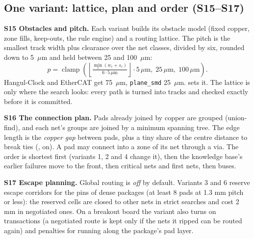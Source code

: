 \documentclass[10pt,a4paper]{article}
\newcommand{\opt}[1]{\texttt{\detokenize{#1}}}
\newcommand{\step}[1]{\textsf{\textbf{#1}}}
\begin{document}
\subsection{One variant: lattice, plan and order (S15--S17)}

\step{S15 Obstacles and pitch.} Each variant builds its obstacle model (fixed copper, zone fills, keep-outs, the rule engine) and a
routing lattice. The pitch is the smallest track width plus clearance over the net classes, divided by six, rounded down to 5~$\mu$m and
held between 25 and 100~$\mu$m:
\[ p = \operatorname{clamp}\!\left(\left\lfloor \tfrac{\min_c (w_c + s_c)}{6 \cdot 5\,\mu\text{m}} \right\rfloor \cdot 5\,\mu\text{m},\; 25\,\mu\text{m},\; 100\,\mu\text{m}\right). \]
Hangul-Clock and EtherCAT get 75~$\mu$m, \texttt{plane\_smd} 25~$\mu$m. \opt{--pitch-um} sets it. The lattice is only where the
search looks: every path is turned into tracks and checked exactly before it is committed.

\step{S16 The connection plan.} Pads already joined by copper are grouped (union-find), and each net's groups are joined by a minimum
spanning tree. The edge length is the \emph{copper gap} between pads, plus a tiny share of the centre distance to break ties
(\opt{--plan-gap}, on). A pad may connect into a zone of its net through a via. The order is shortest first (variants 1, 2 and 4
change it), then the knowledge base's earlier failures move to the front, then critical nets and first nets, then buses.

\step{S17 Escape planning.} Global routing is \emph{off} by default. Variants 3 and 6 reserve escape corridors for the pins of dense
packages (at least 8 pads at 1.3 mm pitch or less): the reserved cells are closed to other nets in strict searches and cost 2 mm in
negotiated ones. On a breakout board the variant also turns on transactions (a negotiated route is kept only if the nets it ripped can
be routed again) and penalties for running along the package's pad layer.
\end{document}
